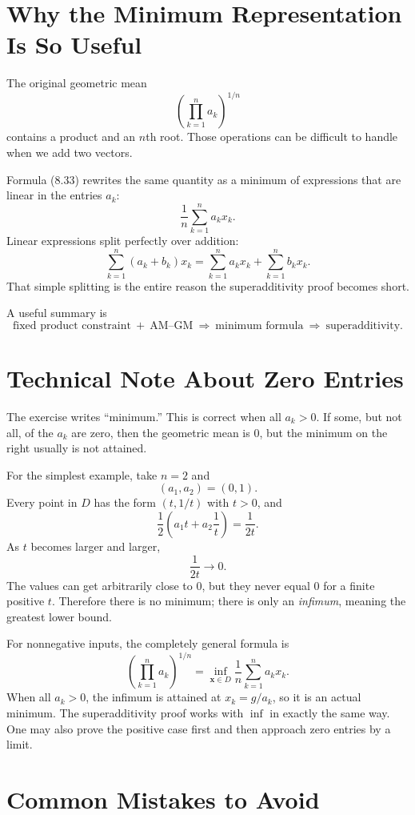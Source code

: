 \documentclass[11pt]{article}
\begin{document}
\section{Why the Minimum Representation Is So Useful}

The original geometric mean
\[
 \left(\prod_{k=1}^{n}a_k\right)^{1/n}
\]
contains a product and an $n$th root.  Those operations can be difficult to
handle when we add two vectors.

Formula (8.33) rewrites the same quantity as a minimum of expressions that are
linear in the entries $a_k$:
\[
 \frac1n\sum_{k=1}^{n}a_kx_k.
\]
Linear expressions split perfectly over addition:
\[
 \sum_{k=1}^{n}(a_k+b_k)x_k
 =\sum_{k=1}^{n}a_kx_k
 +\sum_{k=1}^{n}b_kx_k.
\]
That simple splitting is the entire reason the superadditivity proof becomes
short.

A useful summary is
\[
 \boxed{
 \text{fixed product constraint}
 \ +\ \text{AM--GM}
 \ \Longrightarrow\ \text{minimum formula}
 \ \Longrightarrow\ \text{superadditivity}.
 }
\]

\section{Technical Note About Zero Entries}
\label{sec:zeros}

The exercise writes ``minimum.''  This is correct when all $a_k>0$.  If some,
but not all, of the $a_k$ are zero, then the geometric mean is $0$, but the
minimum on the right usually is not attained.

For the simplest example, take $n=2$ and
\[
 (a_1,a_2)=(0,1).
\]
Every point in $D$ has the form $(t,1/t)$ with $t>0$, and
\[
 \frac12\left(a_1t+a_2\frac1t\right)
 =\frac1{2t}.
\]
As $t$ becomes larger and larger,
\[
 \frac1{2t}\longrightarrow0.
\]
The values can get arbitrarily close to $0$, but they never equal $0$ for a
finite positive $t$.  Therefore there is no minimum; there is only an
\emph{infimum}, meaning the greatest lower bound.

For nonnegative inputs, the completely general formula is
\[
 \boxed{
 \left(\prod_{k=1}^{n}a_k\right)^{1/n}
 =
 \inf_{\mathbf x\in D}
 \frac1n\sum_{k=1}^{n}a_kx_k.
 }
\]
When all $a_k>0$, the infimum is attained at $x_k=g/a_k$, so it is an actual
minimum.  The superadditivity proof works with $\inf$ in exactly the same way.
One may also prove the positive case first and then approach zero entries by a
limit.

\section{Common Mistakes to Avoid}
\end{document}
